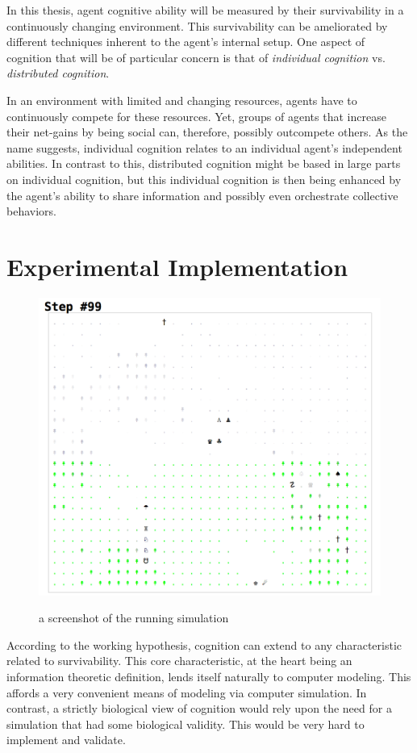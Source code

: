 In this thesis, agent cognitive ability will be measured by their survivability in a continuously changing environment. This survivability can be ameliorated by different techniques inherent to the agent's internal setup. One aspect of cognition that will be of particular concern is that of \textit{individual cognition} vs. \textit{distributed cognition}. 

In an environment with limited and changing resources, agents have to continuously compete for these resources. Yet, groups of agents that increase their net-gains by being social can, therefore, possibly outcompete others. As the name suggests, individual cognition relates to an individual agent's independent abilities. In contrast to this, distributed cognition might be based in large parts on individual cognition, but this individual cognition is then being enhanced by the agent's ability to share information and possibly even orchestrate collective behaviors.

\chapter{Experimental Implementation}
\begin{figure}[h]
\centering\includegraphics[width=0.7\linewidth]{screenshot_simulation.png}
\begin{captionbelow}{a screenshot of the running simulation}\end{captionbelow}
\end{figure}

According to the working hypothesis, cognition can extend to any characteristic related to survivability. This core characteristic, at the heart being an information theoretic definition, lends itself naturally to computer modeling. This affords a very convenient means of modeling via computer simulation. In contrast, a strictly biological view of cognition would rely upon the need for a simulation that had some biological validity. This would be very hard to implement and validate.

